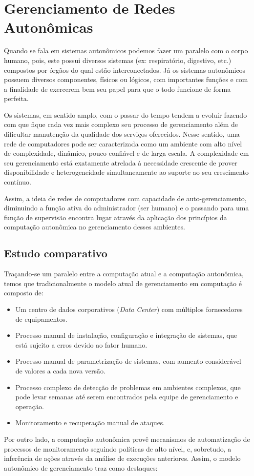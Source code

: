 \documentclass[11pt,twoside]{article}
\begin{document}
\section{Gerenciamento de Redes Autonômicas}
Quando se fala em sistemas autonômicos podemos fazer um paralelo com o corpo humano, pois, este possui diversos sistemas (ex: respiratório, digestivo, etc.) compostos por órgãos do qual estão interconectados. Já os sistemas autonômicos possuem diversos componentes, físicos ou lógicos, com importantes funções e com a finalidade de exercerem bem seu papel para que o todo funcione de forma perfeita.

Os sistemas, em sentido amplo, com o passar do tempo tendem a evoluir fazendo com que fique cada vez mais complexo seu processo de gerenciamento além de dificultar manutenção da qualidade dos serviços oferecidos. Nesse sentido, uma rede de computadores pode ser caracterizada como um ambiente com alto nível de complexidade, dinâmico, pouco confiável e de larga escala. A complexidade em seu gerenciamento está exatamente atrelada à necessidade crescente de prover disponibilidade e heterogeneidade simultaneamente ao suporte ao seu crescimento contínuo.

Assim, a ideia de redes de computadores com capacidade de auto-gerenciamento, diminuindo a função ativa do administrador (ser humano) e o passando para uma função de supervisão encontra lugar através da aplicação dos princípios da computação autonômica no gerenciamento desses ambientes.

\subsection{Estudo comparativo}
Traçando-se um paralelo entre a computação atual e a computação autonômica, temos que tradicionalmente o modelo atual de gerenciamento em computação é composto de:
\begin{itemize}
\item Um centro de dados corporativos (\textit{Data Center}) com múltiplos fornecedores de equipamentos.
\item Processo manual de instalação, configuração e integração de sistemas, que está sujeito a erros devido ao fator humano.
\item Processo manual de parametrização de sistemas, com aumento considerável de valores a cada nova versão.
\item Processo complexo de detecção de problemas em ambientes complexos, que pode levar semanas até serem encontrados pela equipe de gerenciamento e operação.
\item Monitoramento e recuperação manual de ataques.
\end{itemize}
Por outro lado, a computação autonômica provê mecanismos de automatização de processos de monitoramento seguindo políticas de alto nível, e, sobretudo, a inferência de ações através da análise de execuções anteriores. Assim, o modelo autonômico de gerenciamento traz como destaques:
\end{document}
